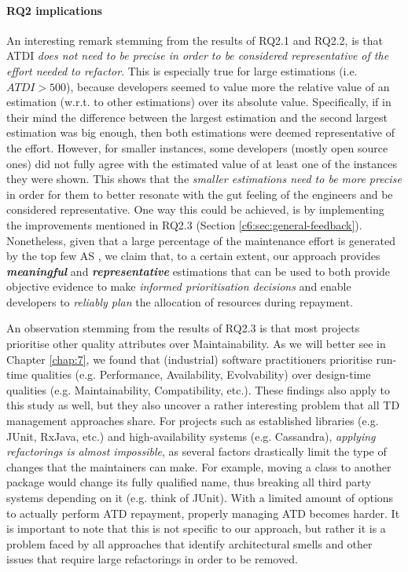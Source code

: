 \paragraph{RQ2 implications}
An interesting remark stemming from the results of RQ2.1 and RQ2.2, is that ATDI \emph{does not need to be precise in order to be considered representative of the effort needed to refactor}.
This is especially true for large estimations (i.e. $ATDI > 500$), because developers seemed to value more the relative value of an estimation (w.r.t. to other estimations) over its absolute value.
Specifically, if in their mind the difference between the largest estimation and the second largest estimation was big enough, then both estimations were deemed representative of the effort. 
However, for smaller instances, some developers (mostly open source ones) did not fully agree with the estimated value of at least one of the instances they were shown.
This shows that the \emph{smaller estimations need to be more precise} in order for them to better resonate with the gut feeling of the engineers and be considered representative.
One way this could be achieved, is by implementing the improvements mentioned in RQ2.3 (Section \ref{c6:sec:general-feedback}).
Nonetheless, given that a large percentage of the maintenance effort is generated by the top few AS \cite{Xiao2016}, we claim that, to a certain extent, our approach provides \emph{\textbf{meaningful}} and \emph{\textbf{representative}} estimations that can be used to both provide objective evidence to make \emph{informed prioritisation decisions} and enable developers to \emph{reliably plan} the allocation of resources during repayment. 

An observation stemming from the results of RQ2.3 is that most projects prioritise other quality attributes over Maintainability.
As we will better see in Chapter \ref{chap:7}, we found that (industrial) software practitioners prioritise run-time qualities (e.g. Performance, Availability, Evolvability) over design-time qualities (e.g. Maintainability, Compatibility, etc.).
These findings also apply to this study as well, but they also uncover a rather interesting problem that all TD management approaches share.
For projects such as established libraries (e.g. JUnit, RxJava, etc.) and high-availability systems (e.g. Cassandra), \emph{applying refactorings is almost impossible}, as several factors drastically limit the type of changes that the maintainers can make.
For example, moving a class to another package would change its fully qualified name, thus breaking all third party systems depending on it (e.g. think of JUnit).
With a limited amount of options to actually perform ATD repayment, properly managing ATD becomes harder.
It is important to note that this is not specific to our approach, but rather it is a problem faced by all approaches that identify architectural smells and other issues that require large refactorings in order to be removed.

